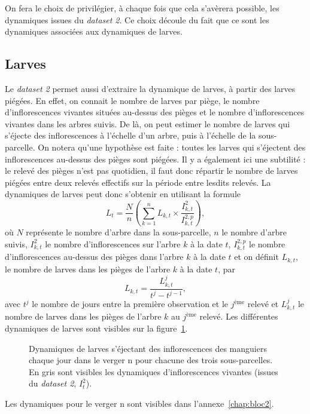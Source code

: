 On fera le choix de privilégier, à chaque fois que cela s'avèrera possible, les dynamiques issues du \emph{dataset 2}.
Ce choix découle du fait que ce sont les dynamiques associées aux dynamiques de larves.


\subsection{Larves}

Le \emph{dataset 2} permet aussi d'extraire la dynamique de larves, à partir des larves piégées.
En effet, on connait le nombre de larves par piège, le nombre d'inflorescences vivantes situées au-dessus des pièges et le nombre d'inflorescences vivantes dans les arbres suivis.
De là, on peut estimer le nombre de larves qui s'éjecte des inflorescences à l'échelle d'un arbre, puis à l'échelle de la sous-parcelle.
On notera qu'une hypothèse est faite : toutes les larves qui s'éjectent des inflorescences au-dessus des pièges sont piégées.
Il y a également ici une subtilité : le relevé des pièges n'est pas quotidien, il faut donc répartir le nombre de larves piégées entre deux relevés effectifs sur la période entre lesdits relevés.
La dynamiques de larves peut donc s'obtenir en utilisant la formule 
\[
L_t = \frac{N}{n}\left(\sum_{k = 1}^n L_{k, t} \times \frac{I_{k, t}^{2}}{I_{k, t}^{2, p}} \right),
\]
où $N$ représente le nombre d'arbre dans la sous-parcelle, $n$ le nombre d'arbre suivis, $I^{2}_{k, t}$ le nombre d'inflorescences sur l'arbre $k$ à la date $t$, $I^{2, p}_{k, t}$ le nombre d'inflorescences au-dessus des pièges dans l'arbre $k$ à la date $t$ et on définit $L_{k,t}$, le nombre de larves dans les pièges de l’arbre $k$ à la date $t$, par
\[
L_{k,t} = \frac{L_{k, t}^j}{t^j - t^{j-1}},
\]
avec $t^j$  le nombre de jours entre la première observation et le $j^{\text{ème}}$ relevé et $L_{k, t}^j$ le nombre de larves dans les pièges de l'arbre $k$ au $j^{\text{ème}}$ relevé.
Les différentes dynamiques de larves sont visibles sur la figure~\ref{fig:larves}.
\begin{figure}[ht]
\centering
{}
\caption{Dynamiques de larves s'éjectant des inflorescences des manguiers chaque jour dans le verger n pour chacune des trois sous-parcelles. En gris sont visibles les dynamiques d'inflorescences vivantes (issues du \emph{dataset 2}, $I^2_t$).}
\label{fig:larves}
\end{figure}

Les dynamiques pour le verger n sont visibles dans l'annexe~\ref{chap:bloc2}.
